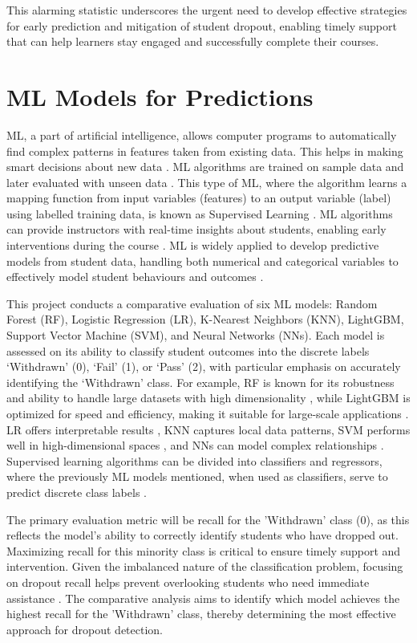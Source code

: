 \documentclass[ %
                    author={Carlos Duran Calle},
                supervisor={Dr. Felipe Campelo},
                    degree={MSc},
                     title={Comparative Machine Learning Analysis for Student Dropout Prediction in a Virtual Learning Environment},
                  subtitle={Incorporating Student Engagement and Socio-Economic Features},
                      type={},
                      year={2025}]{dissertation}
\begin{document}
This alarming statistic underscores the urgent need to develop effective strategies for early prediction and mitigation of student dropout, enabling timely support that can help learners stay engaged and successfully complete their courses.

\section{ML Models for Predictions}
ML, a part of artificial intelligence, allows computer programs to automatically find complex patterns in features taken from existing data. This helps in making smart decisions about new data \cite{holland_ML_1992}. ML algorithms are trained on sample data and later evaluated with unseen data \cite{kotsiantis_2004}. This type of ML, where the algorithm learns a mapping function from input variables (features) to an output variable (label) using labelled training data, is known as Supervised Learning \cite{murphy_ml_2012}. ML algorithms can provide instructors with real-time insights about students, enabling early interventions during the course \cite{kai_2017}. ML is widely applied to develop predictive models from student data, handling both numerical and categorical variables to effectively model student behaviours and outcomes \cite{baker_educational_2014}. 

This project conducts a comparative evaluation of six ML models: Random Forest (RF), Logistic Regression (LR), K-Nearest Neighbors (KNN), LightGBM, Support Vector Machine (SVM), and Neural Networks (NNs). Each model is assessed on its ability to classify student outcomes into the discrete labels ‘Withdrawn’ (0), ‘Fail’ (1), or ‘Pass’ (2), with particular emphasis on accurately identifying the ‘Withdrawn’ class. For example, RF is known for its robustness and ability to handle large datasets with high dimensionality \cite{breiman_rf_2001}, while LightGBM is optimized for speed and efficiency, making it suitable for large-scale applications \cite{friedman_gbm_2001}. LR offers interpretable results \cite{harrell_LR_2015}, KNN captures local data patterns, SVM performs well in high-dimensional spaces \cite{cortes_svm_1995}, and NNs can model complex relationships \cite{lecun_nn_gradient-applied_1998}. Supervised learning algorithms can be divided into classifiers and regressors, where the previously ML models mentioned, when used as classifiers, serve to predict discrete class labels \cite{geron_oreilly_2019}.

The primary evaluation metric will be recall for the 'Withdrawn' class (0), as this reflects the model’s ability to correctly identify students who have dropped out. Maximizing recall for this minority class is critical to ensure timely support and intervention. Given the imbalanced nature of the classification problem, focusing on dropout recall helps prevent overlooking students who need immediate assistance \cite{sokolova_classification_tasks_2009}. The comparative analysis aims to identify which model achieves the highest recall for the 'Withdrawn' class, thereby determining the most effective approach for dropout detection.
\end{document}
